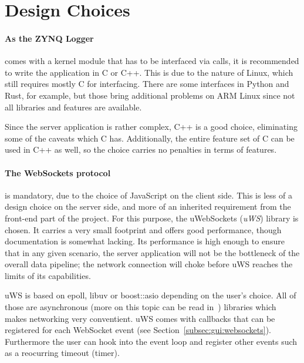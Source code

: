 \section{Design Choices} %
\label{sec:server:design_choices}

\paragraph{As  the ZYNQ  Logger} comes  with a  kernel module  that has  to be
interfaced via  calls, it  is recommended to write the application
in C or C++. This is due to the nature of Linux, which still requires mostly C
for interfacing. There  are some   interfaces in Python  and Rust,
for example,  but those bring additional  problems on ARM Linux  since not all
libraries and features are available.

Since  the  server application  is  rather  complex,  C++  is a  good  choice,
eliminating some of the caveats  which C has. Additionally, the entire feature
set of  C can be used  in C++ as well,  so the choice carries  no penalties in
terms of features.

\paragraph{The  WebSockets  protocol}  is  mandatory, due  to  the  choice  of
JavaScript on the client side.  This is  less of a design choice on the server
side,  and  more of  an  inherited  requirement  from  the front-end  part  of
the  project. For  this  purpose,  the  uWebSockets  (\emph{uWS})  library  is
chosen.  It carries a very small footprint and offers good performance, though
documentation is  somewhat lacking. Its performance  is high enough  to ensure
that in any given scenario, the  server application will not be the bottleneck
of the  overall data pipeline;  the network  connection will choke  before uWS
reaches the limits of its capabilities.

uWS  is  based  on  epoll,  libuv  or  boost::asio  depending  on  the  user's
choice. All  of  those are  asynchronous  (more  on  this  topic can  be  read
in~\cite{uws:async}) libraries  which makes  networking very  conventient. uWS
comes with  callbacks that  can be  registered for  each WebSocket  event (see
Section~\ref{subsec:gui:websockets}). Furthermore the  user can hook  into the
event loop and register other events such as a reocurring timeout (timer).

